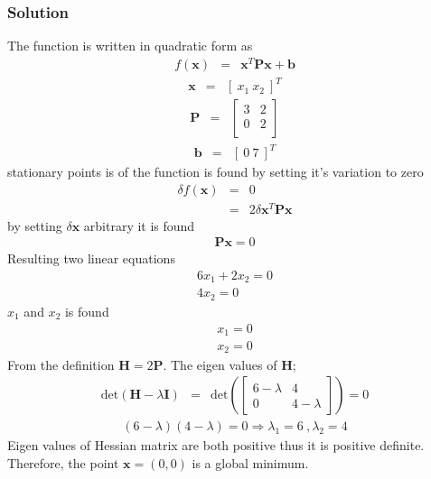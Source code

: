 \documentclass[]{report}
\begin{document}
\subsubsection*{Solution}
The function is written in quadratic form as
\begin{eqnarray*}
f\left(\mathbf{x}\right)&=&\mathbf{x}^T\mathbf{P}\mathbf{x}+\mathbf{b}
\label{eqproblem:4.22}
\end{eqnarray*}
\begin{eqnarray*}
\mathbf{x}&=&\left[\ x_1 \  x_2 \ \right]^T
\end{eqnarray*}
\begin{eqnarray*}
\mathbf{P}&=&\left[\begin{array}{ccc}
3& 2 \\
0& 2\\
\end{array}\right]
\end{eqnarray*}
\begin{eqnarray*}
\mathbf{b}&=&\left[\ 0 \  7 \ \right]^T
\end{eqnarray*}
stationary points is of the function is found by setting it's variation to zero
\begin{eqnarray*}
\delta{ f \left(\mathbf{x}\right)} &=& 0 \\
&=& 2\delta{\mathbf{x}}^T\mathbf{P}\mathbf{x}
\end{eqnarray*}
by setting $\delta \mathbf{x}$ arbitrary it is found
\begin{eqnarray*}
\mathbf{P}\mathbf{x}=0
\end{eqnarray*}
Resulting two linear equations
\begin{eqnarray*}
6x_1+2x_2=0\\
4x_2=0
\end{eqnarray*}
$x_1$ and $x_2$ is found
\begin{eqnarray*}
x_1=0\\
x_2=0
\end{eqnarray*}
From the definition $\mathbf H=2\mathbf{P}$. The eigen values of $\mathbf H$;
\begin{eqnarray*}
\mathrm{det}\left(\mathbf{H}-\lambda \mathbf{I}\right)&=&\mathrm{det}\left(\left[\begin{array}{cc}
6-\lambda& 4\\
0& 4-\lambda
\end{array}\right]\right)=0
\end{eqnarray*}
\begin{eqnarray*}
\left(6-\lambda\right) \left(4-\lambda\right)=0 \Longrightarrow \lambda_1=6 \ , \lambda_2=4
\end{eqnarray*}
Eigen values of Hessian matrix are both positive thus it is positive definite. Therefore, the point $\mathbf x=\left(0,0\right)$ is a global minimum.
\end{document}
